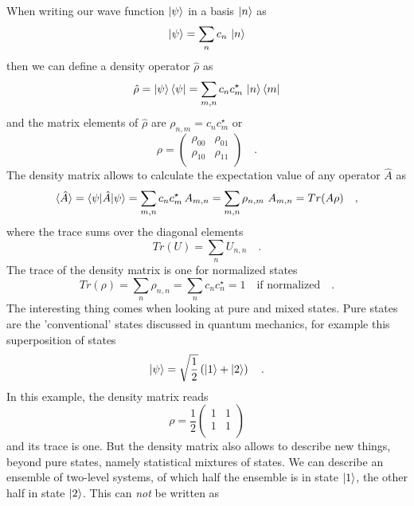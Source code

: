 When  writing our wave function $\ket{\psi}$ in  a basis $\ket{n}$ as
\begin{equation}
 \ket{\psi} = \sum_n c_n \, \ket{n}
\end{equation}
then we can define a density operator $\hat{\rho}$ as
\begin{equation}
\hat{\rho} =  \ket{\psi}\bra{\psi} = \sum_{m,n} c_n c_m^\star \, \ket{n}\bra{m}
\end{equation}
and the matrix elements of $\hat{\rho}$ are $\rho_{n,m} =  c_n c_m^\star$ or 
\begin{equation}
 \rho = \begin{pmatrix}
  \rho_{00} &   \rho_{01} \\  \rho_{10} &  \rho_{11} \\
 \end{pmatrix} \quad .
\end{equation} 
The density matrix allows to calculate the expectation value of any operator $\hat{A}$ as
\begin{equation}
 \braket{\hat{A}} =  \braket{\psi | \hat{A} | \psi}  = \sum_{m,n} c_n c_m^\star \, A_{m,n} = \sum_{m,n} \rho_{n,m} \,  \, A_{m,n} = Tr ( A \rho) \quad ,
\end{equation}
where the trace sums over the diagonal elements
\begin{equation}
 Tr (U ) = \sum_n U_{n,n}  \quad .
\end{equation}
The trace of the density matrix is one for normalized states 
\begin{equation}
 Tr (\rho) = \sum_n \rho_{n,n} = \sum_n c_n c_n^\star = 1 \quad \text{if normalized} \quad .
\end{equation}
The interesting thing comes when looking at pure and mixed states. Pure states are the 'conventional' states discussed in quantum mechanics, for example this superposition of states
\begin{equation}
\ket{\psi} = \sqrt{\frac{1}{2}} \left( \ket{1} + \ket{2} \right)  \quad .
\end{equation}
In this example, the density matrix reads
\begin{equation}
 \rho = \frac{1}{2} \begin{pmatrix}
 1 & 1 \\ 1 & 1 \\
 \end{pmatrix}
\end{equation}
and its trace is one. But the density matrix also allows to describe new things, beyond pure states, namely statistical mixtures of states. We can describe an ensemble of two-level systems, of which half the ensemble is in state $\ket{1}$, the other half in state $\ket{2}$. This can \emph{not} be written as 
